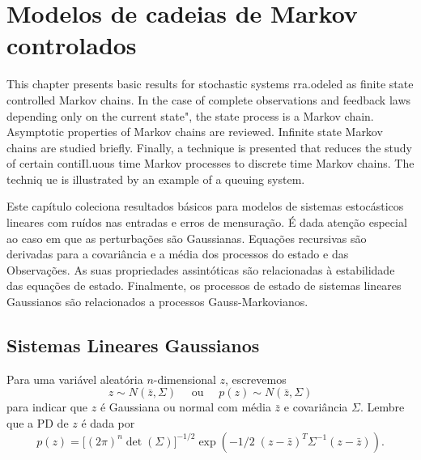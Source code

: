 

\chapter{Modelos de cadeias de Markov controlados}
This chapter presents basic results for stochastic systems rra.odeled as finite state controlled Markov chains. In the case of complete observations and feedback laws depending only on the current state", the state process is a Markov chain. Asymptotic properties of Markov chains are reviewed. Infinite state Markov chains are studied briefly. Finally, a
technique is presented that reduces the study of certain contiIl.uous time Markov processes to discrete time Markov chains. The techniq ue is illustrated by an example of a queuing system.




Este capítulo coleciona resultados básicos para modelos de sistemas estocásticos lineares com ruídos nas entradas e erros de mensuração. É dada atenção especial ao caso em que as perturbações são Gaussianas. Equações recursivas são derivadas para a covariância e a média dos processos do estado e das Observações. As suas propriedades assintóticas são relacionadas à estabilidade das equações de estado. Finalmente, os processos de estado de sistemas lineares Gaussianos são relacionados a processos Gauss-Markovianos.




\section{Sistemas Lineares Gaussianos}
Para uma variável aleatória $n$-dimensional $z$, escrevemos
\begin{equation}\label{3.1.1}
	z \sim N(\bar z, \Sigma) \quad
	\text{ ou }\quad p(z) \sim N(\bar z,
	\Sigma)
\end{equation}
para indicar que $z$ é Gaussiana ou normal com média $\bar z$ e covariância $\Sigma$. Lembre que a PD de $z$ é dada por
\begin{equation}\label{3.1.2}
	p(z)=\Big[(2\pi)^n \det(\Sigma)
	\Big]^{-1/2}\exp\left(-1/2\;
	(z-\bar z)^T\Sigma^{-1}(z-\bar z)\right).
\end{equation}

